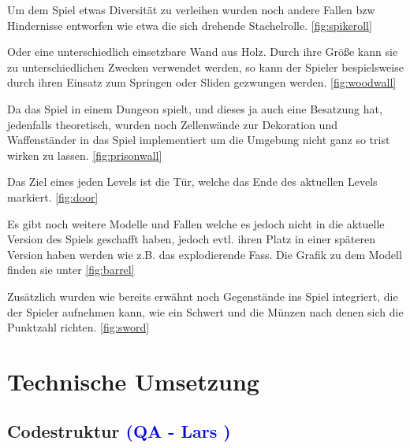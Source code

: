 \documentclass[12pt]{article}
\begin{document}
Um dem Spiel etwas Diversität zu verleihen wurden noch andere Fallen bzw Hindernisse entworfen wie etwa die sich drehende Stachelrolle. \ref{fig:spikeroll}\newline

Oder eine unterschiedlich einsetzbare Wand aus Holz. Durch ihre Größe kann sie zu unterschiedlichen Zwecken verwendet werden, so kann der Spieler bespielsweise durch ihren Einsatz zum 
Springen oder Sliden gezwungen werden. \ref{fig:woodwall}\newline

Da das Spiel in einem Dungeon spielt, und dieses ja auch eine Besatzung hat, jedenfalls theoretisch, wurden noch Zellenwände zur Dekoration und Waffenständer in das Spiel implementiert
um die Umgebung nicht ganz so trist wirken zu lassen. \ref{fig:prisonwall}\newline

Das Ziel eines jeden Levels ist die Tür, welche das Ende des aktuellen Levels markiert. \ref{fig:door}\newline

Es gibt noch weitere Modelle und Fallen welche es jedoch nicht in die aktuelle Version des Spiels geschafft haben, jedoch evtl. ihren Platz in einer späteren Version haben werden wie z.B. das
explodierende Fass. Die Grafik zu dem Modell finden sie unter \ref{fig:barrel}\newline

Zusätzlich wurden wie bereits erwähnt noch Gegenstände ins Spiel integriert, die der Spieler aufnehmen kann, wie ein Schwert und die Münzen nach denen sich die Punktzahl richten. \ref{fig:sword}\newline

\newpage
\section{Technische Umsetzung}

\vspace{2cm}
\subsection{Codestruktur \textcolor{blue}{(QA - Lars )}}
\end{document}
